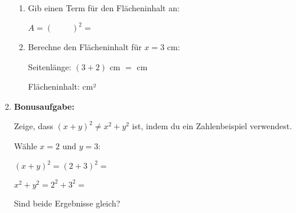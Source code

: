 \begin{enumerate}[label=\arabic*., resume]
    \begin{enumerate}[label=\alph*)]
        \item Gib einen Term für den Flächeninhalt an:
        \vspace{0.3cm}

        $A = (\phantom{x + 0})^2 = $ \underline{\hspace{4cm}}

        \vspace{0.5cm}

        \item Berechne den Flächeninhalt für $x = 3$ cm:
        \vspace{0.3cm}

        Seitenlänge: $(3 + 2)$ cm $= $ \underline{\hspace{2cm}} cm

        \vspace{0.3cm}

        Flächeninhalt: \underline{\hspace{4cm}} cm²

    \end{enumerate}

    \vspace{1cm}

    \item \textbf{Bonusaufgabe:}

    Zeige, dass $(x + y)^2 \neq x^2 + y^2$ ist, indem du ein Zahlenbeispiel verwendest.

    \vspace{0.5cm}

    Wähle $x = 2$ und $y = 3$:

    \vspace{0.3cm}

    $(x + y)^2 = (2 + 3)^2 = $ \underline{\hspace{2cm}}

    \vspace{0.3cm}

    $x^2 + y^2 = 2^2 + 3^2 = $ \underline{\hspace{2cm}}

    \vspace{0.3cm}

    Sind beide Ergebnisse gleich? \underline{\hspace{2cm}}

\end{enumerate}